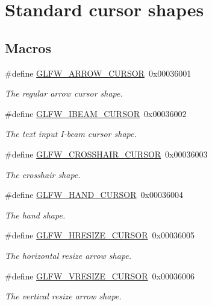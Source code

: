 \hypertarget{group__shapes}{}\section{Standard cursor shapes}
\label{group__shapes}
\subsection*{Macros}
\begin{DoxyCompactItemize}
\item 
\#define \hyperlink{group__shapes_ga8ab0e717245b85506cb0eaefdea39d0a}{G\+L\+F\+W\+\_\+\+A\+R\+R\+O\+W\+\_\+\+C\+U\+R\+S\+O\+R}~0x00036001
\begin{DoxyCompactList}\small\item\em The regular arrow cursor shape. \end{DoxyCompactList}\item 
\#define \hyperlink{group__shapes_ga36185f4375eaada1b04e431244774c86}{G\+L\+F\+W\+\_\+\+I\+B\+E\+A\+M\+\_\+\+C\+U\+R\+S\+O\+R}~0x00036002
\begin{DoxyCompactList}\small\item\em The text input I-\/beam cursor shape. \end{DoxyCompactList}\item 
\#define \hyperlink{group__shapes_ga8af88c0ea05ab9e8f9ac1530e8873c22}{G\+L\+F\+W\+\_\+\+C\+R\+O\+S\+S\+H\+A\+I\+R\+\_\+\+C\+U\+R\+S\+O\+R}~0x00036003
\begin{DoxyCompactList}\small\item\em The crosshair shape. \end{DoxyCompactList}\item 
\#define \hyperlink{group__shapes_ga1db35e20849e0837c82e3dc1fd797263}{G\+L\+F\+W\+\_\+\+H\+A\+N\+D\+\_\+\+C\+U\+R\+S\+O\+R}~0x00036004
\begin{DoxyCompactList}\small\item\em The hand shape. \end{DoxyCompactList}\item 
\#define \hyperlink{group__shapes_gabb3eb0109f11bb808fc34659177ca962}{G\+L\+F\+W\+\_\+\+H\+R\+E\+S\+I\+Z\+E\+\_\+\+C\+U\+R\+S\+O\+R}~0x00036005
\begin{DoxyCompactList}\small\item\em The horizontal resize arrow shape. \end{DoxyCompactList}\item 
\#define \hyperlink{group__shapes_gaf024f0e1ff8366fb2b5c260509a1fce5}{G\+L\+F\+W\+\_\+\+V\+R\+E\+S\+I\+Z\+E\+\_\+\+C\+U\+R\+S\+O\+R}~0x00036006
\begin{DoxyCompactList}\small\item\em The vertical resize arrow shape. \end{DoxyCompactList}\end{DoxyCompactItemize}


